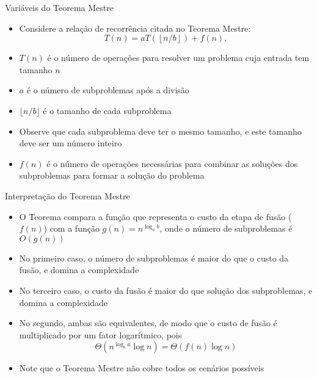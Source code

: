 \begin{frame}[fragile]{Variáveis do Teorema Mestre}

    \begin{itemize}
        \item Considere a relação de recorrência citada no Teorema Mestre:
        \[
            T(n) = aT\left(\left\lfloor n/b\right\rfloor\right) + f(n),
        \]

        \item $T(n)$ é o número de operações para resolver um problema cuja entrada tem tamanho $n$

        \item $a$ é o número de subproblemas após a divisão

        \item $\lfloor n/b\rfloor$ é o tamanho de cada subproblema

        \item Observe que cada subproblema deve ter o mesmo tamanho, e este tamanho deve ser
            um número inteiro

        \item $f(n)$ é o número de operações necessárias para combinar as soluções dos subproblemas
            para formar a solução do problema
    \end{itemize}

\end{frame}

\begin{frame}[fragile]{Interpretação do Teorema Mestre}

    \begin{itemize}
        \item O Teorema compara a função que representa o custo da etapa de fusão ($f(n)$) com a
            função $g(n) = n^{\log_a b}$, onde o número de subproblemas é $O(g(n))$

        \item No primeiro caso, o número de subproblemas é maior do que o custo da fusão, e domina
            a complexidade

        \item No terceiro caso, o custo da fusão é maior do que solução dos subproblemas, e domina
            a complexidade

        \item No segundo, ambas são equivalentes, de modo que o custo de fusão é multiplicado por
            um fator logarítmico, pois 
            \[
                \Theta(n^{\log_b a}\log n) = \Theta(f(n)\log n)
            \]

        \item Note que o Teorema Mestre não cobre todos os cenários possíveis
    \end{itemize}

\end{frame}
